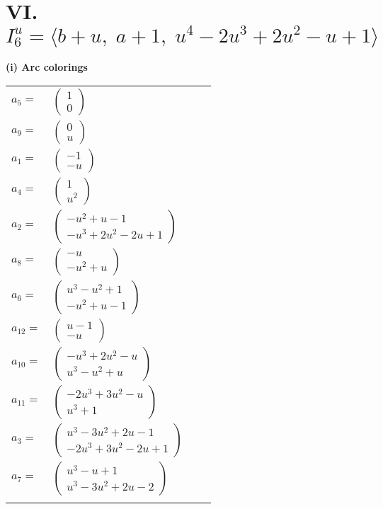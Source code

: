 \documentclass[1p]{elsarticle_modified}
\theoremstyle{definition}
\begin{document}
\centering \section*{VI. $I^u_{6}= \langle b+u,\;a+1,\;u^4-2 u^3+2 u^2- u+1 \rangle$}
\flushleft \textbf{(i) Arc colorings}\\
\begin{tabular}{m{7pt} m{180pt} m{7pt} m{180pt} }
\flushright $a_{5}=$&$\begin{pmatrix}1\\0\end{pmatrix}$ \\
\flushright $a_{9}=$&$\begin{pmatrix}0\\u\end{pmatrix}$ \\
\flushright $a_{1}=$&$\begin{pmatrix}-1\\- u\end{pmatrix}$ \\
\flushright $a_{4}=$&$\begin{pmatrix}1\\u^2\end{pmatrix}$ \\
\flushright $a_{2}=$&$\begin{pmatrix}- u^2+u-1\\- u^3+2 u^2-2 u+1\end{pmatrix}$ \\
\flushright $a_{8}=$&$\begin{pmatrix}- u\\- u^2+u\end{pmatrix}$ \\
\flushright $a_{6}=$&$\begin{pmatrix}u^3- u^2+1\\- u^2+u-1\end{pmatrix}$ \\
\flushright $a_{12}=$&$\begin{pmatrix}u-1\\- u\end{pmatrix}$ \\
\flushright $a_{10}=$&$\begin{pmatrix}- u^3+2 u^2- u\\u^3- u^2+u\end{pmatrix}$ \\
\flushright $a_{11}=$&$\begin{pmatrix}-2 u^3+3 u^2- u\\u^3+1\end{pmatrix}$ \\
\flushright $a_{3}=$&$\begin{pmatrix}u^3-3 u^2+2 u-1\\-2 u^3+3 u^2-2 u+1\end{pmatrix}$ \\
\flushright $a_{7}=$&$\begin{pmatrix}u^3- u+1\\u^3-3 u^2+2 u-2\end{pmatrix}$\\&\end{tabular}
\end{document}
